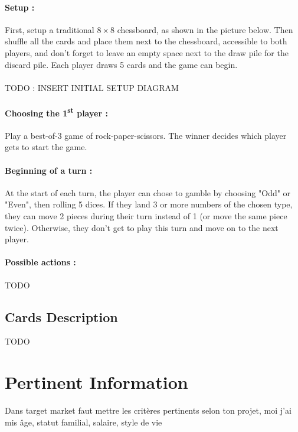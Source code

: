 \documentclass[12pt]{article}
\begin{document}
            \paragraph{Setup :\\}
                First, setup a traditional $8\times8$ chessboard, as shown in the picture below. Then shuffle all the cards and place them next to the chessboard, accessible to both players, and don't forget to leave an empty space next to the draw pile for the discard pile. Each player draws 5 cards and the game can begin.
            \paragraph{}
                \centerline{TODO : INSERT INITIAL SETUP DIAGRAM}
            \paragraph{Choosing the 1\textsuperscript{st} player :\\}
                Play a best-of-3 game of rock-paper-scissors. The winner decides which player gets to start the game.
            \paragraph{Beginning of a turn :\\}
                At the start of each turn, the player can chose to gamble by choosing "Odd" or "Even", then rolling 5 dices. If they land 3 or more numbers of the chosen type, they can move 2 pieces during their turn instead of 1 (or move the same piece twice). Otherwise, they don't get to play this turn and move on to the next player.
            \paragraph{Possible actions :\\}
                TODO
        \subsection{Cards Description}
            TODO
    
    \section{Pertinent Information}
        Dans target market faut mettre les critères pertinents selon ton projet, moi j'ai mis âge, statut familial, salaire, style de vie
    
\end{document}
